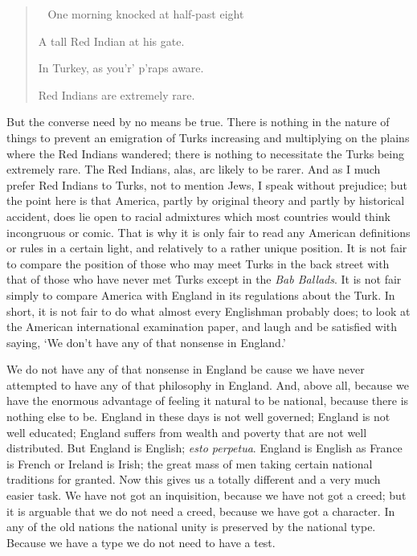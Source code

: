 \documentclass{book}
\newenvironment{mdblockquote}{%
  \begin{quotation}
    \
}{%
  \end{quotation}
}
\begin{document}
\begin{mdblockquote}
	One morning knocked at half-past eight

	A tall Red Indian at his gate.

	In Turkey, as you’r’ p’raps aware.

	Red Indians are extremely rare.


\end{mdblockquote}
But the converse need by no means be true. There is nothing in the nature of things to prevent an emigration of Turks increasing and multiplying on the plains where the Red Indians wandered; there is nothing to necessitate the Turks being extremely rare. The Red Indians, alas, arc likely to be rarer. And as I much prefer Red Indians to Turks, not to mention Jews, I speak without prejudice; but the point here is that America, partly by original theory and partly by historical accident, does lie open to racial admixtures which most countries would think incongruous or comic. That is why it is only fair to read any American definitions or rules in a certain light, and relatively to a rather unique position. It is not fair to compare the position of those who may meet Turks in the back street with that of those who have never met Turks except in the \emph{Bab Ballads}. It is not fair simply to compare America with England in its regulations about the Turk. In short, it is not fair to do what almost every Englishman probably does; to look at the American international examination paper, and laugh and be satisfied with saying, ‘We don’t have any of that nonsense in England.’

We do not have any of that nonsense in England be cause we have never attempted to have any of that philosophy in England. And, above all, because we have the enormous advantage of feeling it natural to be national, because there is nothing else to be. England in these days is not well governed; England is not well educated; England suffers from wealth and poverty that are not well distributed. But England is English; \emph{esto perpetua}. England is English as France is French or Ireland is Irish; the great mass of men taking certain national traditions for granted. Now this gives us a totally different and a very much easier task. We have not got an inquisition, because we have not got a creed; but it is arguable that we do not need a creed, because we have got a character. In any of the old nations the national unity is preserved by the national type. Because we have a type we do not need to have a test.
\end{document}
